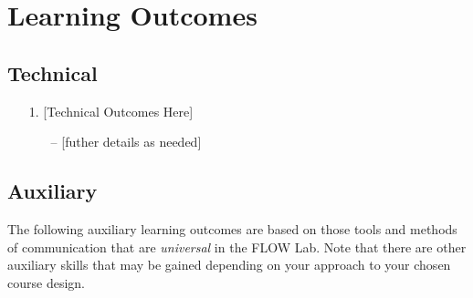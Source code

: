 \documentclass[12pt]{article}
\begin{document}
\section{Learning Outcomes}
\label{sec:learningoutcomes}


\subsection{Technical}
\label{ssec:technicaloutcomes}

\begin{enumerate}
	\item[1.] [Technical Outcomes Here]
	\begin{itemize}
		\item[--] [futher details as needed]
	\end{itemize}
\end{enumerate}


\subsection{Auxiliary}
\label{ssec:auxiliaryoutcomes}

The following auxiliary learning outcomes are based on those tools and methods of communication that are \textit{universal} in the FLOW Lab.  Note that there are other auxiliary skills that may be gained depending on your approach to your chosen course design.
\end{document}
